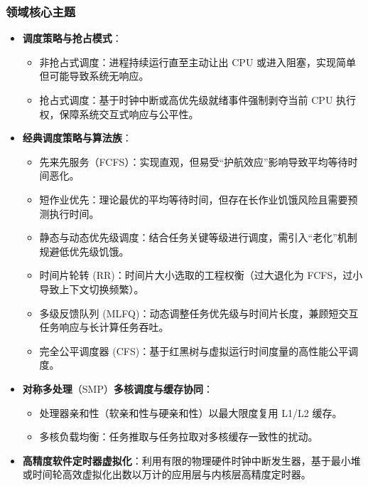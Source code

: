 \subsubsection{领域核心主题}
\begin{itemize}\setlength{\itemsep}{0pt}\setlength{\parskip}{0pt}
    \item \textbf{调度策略与抢占模式}：
    \begin{itemize}\setlength{\itemsep}{0pt}\setlength{\parskip}{0pt}
        \item 非抢占式调度：进程持续运行直至主动让出 CPU 或进入阻塞，实现简单但可能导致系统无响应。
        \item 抢占式调度：基于时钟中断或高优先级就绪事件强制剥夺当前 CPU 执行权，保障系统交互式响应与公平性。
    \end{itemize}
    \item \textbf{经典调度策略与算法族}：
    \begin{itemize}\setlength{\itemsep}{0pt}\setlength{\parskip}{0pt}
        \item 先来先服务（FCFS）：实现直观，但易受“护航效应”影响导致平均等待时间恶化。
        \item 短作业优先：理论最优的平均等待时间，但存在长作业饥饿风险且需要预测执行时间。
        \item 静态与动态优先级调度：结合任务关键等级进行调度，需引入“老化”机制规避低优先级饥饿。
        \item 时间片轮转 (RR)：时间片大小选取的工程权衡（过大退化为 FCFS，过小导致上下文切换频繁）。
        \item 多级反馈队列 (MLFQ)：动态调整任务优先级与时间片长度，兼顾短交互任务响应与长计算任务吞吐。
        \item 完全公平调度器 (CFS)：基于红黑树与虚拟运行时间度量的高性能公平调度。
    \end{itemize}
    \item \textbf{对称多处理}（SMP）\textbf{多核调度与缓存协同}：
    \begin{itemize}\setlength{\itemsep}{0pt}\setlength{\parskip}{0pt}
        \item 处理器亲和性（软亲和性与硬亲和性）以最大限度复用 L1/L2 缓存。
        \item 多核负载均衡：任务推取与任务拉取对多核缓存一致性的扰动。
    \end{itemize}
    \item \textbf{高精度软件定时器虚拟化}：利用有限的物理硬件时钟中断发生器，基于最小堆或时间轮高效虚拟化出数以万计的应用层与内核层高精度定时器。
\end{itemize}


